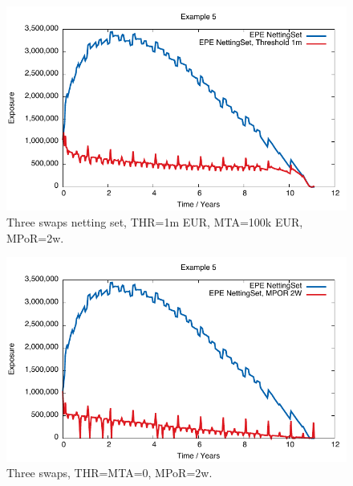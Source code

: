 \documentclass[12pt, a4paper]{article}
\begin{document}
\begin{figure}[hbt]
\begin{center}
\includegraphics[scale=1.0]{example_threshold_epe.pdf}
\end{center}
\caption{Three swaps netting set, THR=1m EUR, MTA=100k EUR, MPoR=2w.}
\label{fig_9}
\end{figure}


\begin{figure}[hbt]
\begin{center}
\includegraphics[scale=1.0]{example_mpor_epe.pdf}
\end{center}
\caption{Three swaps, THR=MTA=0, MPoR=2w.}
\label{fig_10}
\end{figure}
\end{document}
